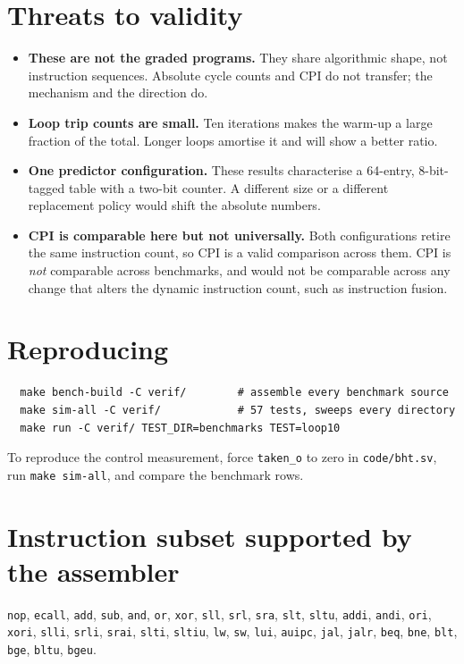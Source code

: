 \documentclass[11pt]{article}
\begin{document}
\section{Threats to validity}

\begin{itemize}
\item \textbf{These are not the graded programs.} They share algorithmic shape, not
      instruction sequences. Absolute cycle counts and CPI do not transfer; the
      mechanism and the direction do.
\item \textbf{Loop trip counts are small.} Ten iterations makes the warm-up a large
      fraction of the total. Longer loops amortise it and will show a better ratio.
\item \textbf{One predictor configuration.} These results characterise a 64-entry,
      8-bit-tagged table with a two-bit counter. A different size or a different
      replacement policy would shift the absolute numbers.
\item \textbf{CPI is comparable here but not universally.} Both configurations retire
      the same instruction count, so CPI is a valid comparison across them. CPI is
      \emph{not} comparable across benchmarks, and would not be comparable across any
      change that alters the dynamic instruction count, such as instruction fusion.
\end{itemize}

\section{Reproducing}

\begin{verbatim}
  make bench-build -C verif/        # assemble every benchmark source
  make sim-all -C verif/            # 57 tests, sweeps every directory
  make run -C verif/ TEST_DIR=benchmarks TEST=loop10
\end{verbatim}

To reproduce the control measurement, force \texttt{taken\_o} to zero in
\texttt{code/bht.sv}, run \texttt{make sim-all}, and compare the benchmark rows.

\appendix
\section{Instruction subset supported by the assembler}

\texttt{nop}, \texttt{ecall}, \texttt{add}, \texttt{sub}, \texttt{and}, \texttt{or},
\texttt{xor}, \texttt{sll}, \texttt{srl}, \texttt{sra}, \texttt{slt}, \texttt{sltu},
\texttt{addi}, \texttt{andi}, \texttt{ori}, \texttt{xori}, \texttt{slli},
\texttt{srli}, \texttt{srai}, \texttt{slti}, \texttt{sltiu}, \texttt{lw},
\texttt{sw}, \texttt{lui}, \texttt{auipc}, \texttt{jal}, \texttt{jalr},
\texttt{beq}, \texttt{bne}, \texttt{blt}, \texttt{bge}, \texttt{bltu},
\texttt{bgeu}.
\end{document}
